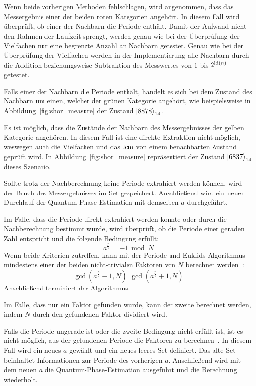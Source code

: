 Wenn beide vorherigen Methoden fehlschlagen, 
wird angenommen, dass das Messergebnis einer der beiden roten Kategorien angehört.
In diesem Fall wird überprüft, ob einer der Nachbarn die Periode enthält.
Damit der Aufwand nicht den Rahmen der Laufzeit sprengt, 
werden genau wie bei der Überprüfung der Vielfachen
nur eine begrenzte Anzahl an Nachbarn getestet.
Genau wie bei der Überprüfung der Vielfachen werden in der Implementierung alle Nachbarn durch 
die Addition beziehungsweise Subtraktion des Messwertes von \(1\) bis \(2^{\operatorname{ld}(n)}\) getestet.

Falls einer der Nachbarn die Periode enthält, 
handelt es sich bei dem Zustand des Nachbarn um einen, 
welcher der grünen Kategorie angehört, 
wie beispielsweise in Abbildung~\ref{fig:shor_measure} der Zustand \(\ket{8878}_{14}\).

Es ist möglich, 
dass die Zustände der Nachbarn des Messergebnisses der gelben Kategorie angehören.
In diesem Fall ist eine direkte Extraktion nicht möglich, 
weswegen auch die Vielfachen und das \(\operatorname{lcm}\) von einem benachbarten Zustand geprüft wird.
In Abbildung~\ref{fig:shor_measure} repräsentiert der Zustand \(\ket{6837}_{14}\) dieses Szenario.

Sollte trotz der Nachberechnung keine Periode extrahiert werden können, 
wird der Bruch des Messergebnisses im Set gespeichert.
Anschließend wird ein neuer Durchlauf der Quantum-Phase-Estimation 
mit demselben \(a\) durchgeführt.

Im Falle, dass die Periode direkt extrahiert werden konnte oder 
durch die Nachberechnung bestimmt wurde, wird überprüft, 
ob die Periode einer geraden Zahl entspricht und die folgende Bedingung erfüllt:
\[a^{\frac{p}{2}} = -1 \bmod N\]
Wenn beide Kriterien zutreffen, 
kann mit der Periode und 
Euklids Algorithmus mindestens einer der beiden nicht-trivialen Faktoren von \(N\) berechnet werden~\cite{Shor_1997}:
\[\gcd(a^{\frac{p}{2}}-1, N), \gcd(a^{\frac{p}{2}}+1, N)\]
Anschließend terminiert der Algorithmus. 

Im Falle, dass nur ein Faktor gefunden wurde, kann der zweite berechnet werden, 
indem \(N\) durch den gefundenen Faktor dividiert wird.

Falls die Periode ungerade ist oder die zweite Bedingung nicht erfüllt ist, 
ist es nicht möglich, aus der gefundenen Periode die Faktoren zu berechnen~\cite{Shor_1997}.
In diesem Fall wird ein neues \(a\) gewählt und ein neues leeres Set definiert. 
Das alte Set beinhaltet Informationen zur Periode des vorherigen \(a\).
Anschließend wird mit dem neuen \(a\) die Quantum-Phase-Estimation ausgeführt und 
die Berechnung wiederholt.

